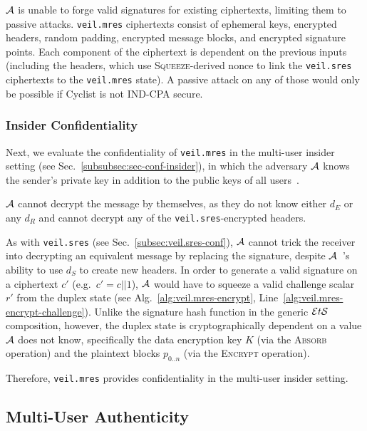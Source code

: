 $\mathcal{A}$ is unable to forge valid signatures for existing ciphertexts, limiting them to passive attacks.
\texttt{veil.mres} ciphertexts consist of ephemeral keys, encrypted headers, random padding, encrypted message blocks,
and encrypted signature points.
Each component of the ciphertext is dependent on the previous inputs (including the headers, which use
\textsc{Squeeze}\@-derived nonce to link the \texttt{veil.sres} ciphertexts to the \texttt{veil.mres} state).
A passive attack on any of those would only be possible if Cyclist is not IND-CPA secure.

\subsubsection{Insider Confidentiality}

Next, we evaluate the confidentiality of \texttt{veil.mres} in the multi-user insider setting
(see Sec.~\ref{subsubsec:sec-conf-insider}), in which the adversary $\mathcal{A}$ knows the sender's private key in
addition to the public keys of all users~\cite[p. 45--46]{baek2010}\@.

$\mathcal{A}$ cannot decrypt the message by themselves, as they do not know either $d_E$ or any $d_R$ and cannot decrypt
any of the \texttt{veil.sres}\@-encrypted headers.

As with \texttt{veil.sres} (see Sec.~\ref{subsec:veil.sres-conf})\@,
$\mathcal{A}$ cannot trick the receiver into decrypting an equivalent message by replacing the signature, despite
$\mathcal{A}$~'s ability to use $d_S$ to create new headers.
In order to generate a valid signature on a ciphertext $c'$ (e.g.\ $c'=c||1$), $\mathcal{A}$ would have to squeeze a
valid challenge scalar $r'$ from the duplex state (see Alg.~\ref{alg:veil.mres-encrypt},
Line~\ref{alg:veil.mres-encrypt-challenge}).
Unlike the signature hash function in the generic $\mathcal{E}t\mathcal{S}$ composition, however, the duplex state is cryptographically
dependent on a value $\mathcal{A}$ does not know, specifically the data encryption key $K$ \@(via the \textsc{Absorb}
operation) and the plaintext blocks $p_{0..n}$ (via the \textsc{Encrypt} operation).

Therefore, \texttt{veil.mres} provides confidentiality in the multi-user insider setting.

\subsection{Multi-User Authenticity}\label{subsec:veil.mres-auth}

